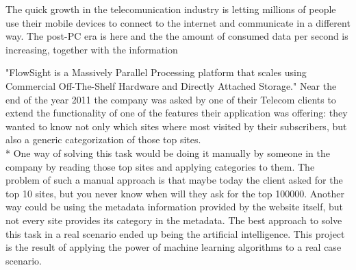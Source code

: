 
The quick growth in the telecomunication industry is letting millions of people use their mobile devices to connect to the internet and communicate in a different way. The post-PC era is here and the 
the amount of consumed data per second is increasing, together with the information 

"FlowSight is a Massively Parallel Processing platform that scales using Commercial Off-The-Shelf Hardware and Directly Attached Storage."
Near the end of the year 2011 the company was asked by one of their Telecom clients to extend the functionality of one of the features their application was offering: they wanted to know not only which sites
where most visited by their subscribers, but also a generic categorization of those top sites. \\*
One way of solving this task would be doing it manually by someone in the company by reading those top sites and applying categories to them.
The problem of such a manual approach is that maybe today the client asked for the top 10 sites, but you never know when will they ask for the top 100000. 
Another way could be using the metadata information provided by the website itself, but not every site provides its category in the metadata.
The best approach to solve this task in a real scenario ended up being the artificial intelligence.
This project is the result of applying the power of machine learning algorithms to a real case scenario.

